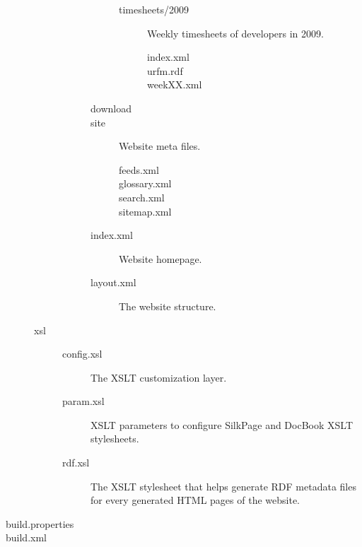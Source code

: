 \begin{description}
\begin{description}
\begin{description}
\begin{description}
\begin{description}
\begin{description}
          \end{description}
        \item[timesheets/2009] Weekly timesheets of developers in 2009.
          \begin{description}
          \item[index.xml]
          \item[urfm.rdf]
          \item[weekXX.xml]
          \end{description}
        \end{description}
      \item[download]
      \item[site] Website meta files.
        \begin{description}
        \item[feeds.xml]
        \item[glossary.xml]
        \item[search.xml]
        \item[sitemap.xml]
        \end{description}
      \item[index.xml] Website homepage.
      \item[layout.xml] The website structure.
      \end{description}
    \end{description}
  \item[xsl]
    \begin{description}
    \item[config.xsl] The XSLT customization layer.
    \item[param.xsl] XSLT parameters to configure SilkPage and DocBook
      XSLT stylesheets.
    \item[rdf.xsl] The XSLT stylesheet that helps generate RDF metadata files 
      for every generated HTML pages of the website.
    \end{description}
  \end{description}
\item[build.properties]
\item[build.xml]
\end{description}

